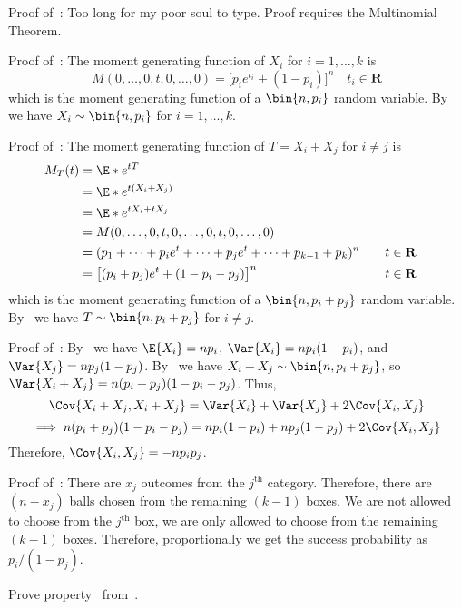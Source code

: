 \begin{Proof}{}{}
    Proof of~: Too long
    for my poor soul to type. Proof requires the Multinomial Theorem.

    Proof of~: The moment
    generating function of $ X_i $ for $ i=1,\ldots,k $ is
    \[ M(0,\ldots,0,t,0,\ldots,0)=\bigl[p_i e^{t_i}+(1-p_i)\bigr]^n
        \quad t_i\in\mathbf{R} \]
    which is the moment generating function of a
    $ \bin{n,p_i} $ random variable. By~
    we have $ X_i \sim \bin{n,p_i} $ for $ i=1,\ldots,k $.

    Proof of~: The moment
    generating function of $ T=X_i+X_j $ for $ i\neq j $ is
    \begin{align*}
        M_T(t)
         & =\E*{e^{tT}}                                                                         \\
         & =\E*{e^{t(X_i+X_j)}}                                                                 \\
         & =\E*{e^{t X_i+t X_j}}                                                                \\
         & =M(0,\ldots,0,t,0,\ldots,0,t,0,\ldots,0)                                             \\
         & =(p_1+\cdots+p_i e^{t}+\cdots+p_j e^t+\cdots+p_{k-1}+p_k)^n & \quad & t\in\mathbf{R} \\
         & =\bigl[ (p_i+p_j)e^t+(1-p_i-p_j) \bigr]^n                   &       & t\in\mathbf{R}
    \end{align*}
    which is the moment generating function of a
    $ \bin{n,p_i+p_j} $ random variable. By~
    we have $ T \sim \bin{n,p_i+p_j} $ for $ i\neq j $.

    Proof of~:
    By~ we have $ \E{X_i}=n p_i $, $ \Var{X_i}=np_i(1-p_i) $,
    and $ \Var{X_j}=np_j(1-p_j) $. By~ we have
    $ X_i+X_j \sim \bin{n,p_i+p_j} $, so
    $ \Var{X_i+X_j}=n(p_i+p_j)(1-p_i-p_j) $.
    Thus,
    \[ \Cov{X_i+X_j,X_i+X_j}=\Var{X_i}+\Var{X_j}+2\Cov{X_i,X_j} \]
    \[ \implies n(p_i+p_j)(1-p_i-p_j)=np_i(1-p_i)+np_j(1-p_j)
        +2\Cov{X_i,X_j} \]
    Therefore, $ \Cov{X_i,X_j}=-n p_i p_j $.

    Proof of~: There are $ x_j $ outcomes
    from the $ j^{\text{th}} $ category. Therefore,
    there are $ (n-x_j) $ balls chosen from the remaining $ (k-1) $
    boxes. We are not allowed to choose from the $ j^{\text{th}} $ box,
    we are only allowed to choose from the remaining $ (k-1) $
    boxes. Therefore, proportionally we get the success probability
    as $ p_i/(1-p_j) $.
\end{Proof}
\begin{Exercise}{}{}
    Prove property~ from~.
\end{Exercise}
